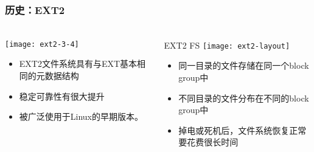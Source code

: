 \begin{frame}[fragile]
	\frametitle{历史：EXT2}
	
	\frametitle{ }
	\begin{columns}[t]
		\begin{column}{.3\textwidth}
			
			\texttt{[image: ext2-3-4]}
			\begin{itemize}
				\item EXT2文件系统具有与EXT基本相同的元数据结构
				\item 稳定可靠性有很大提升
				\item 被广泛使用于Linux的早期版本。
				
			\end{itemize}
			
		\end{column}
		
		\begin{column}{.7\textwidth}			
			EXT2 FS
			\texttt{[image: ext2-layout]}
			\begin{itemize}
				\item 同一目录的文件存储在同一个block group中
				\item 不同目录的文件分布在不同的block group中
				\item 掉电或死机后，文件系统恢复正常要花费很长时间
			\end{itemize}
			
		\end{column}
	\end{columns}
	
\end{frame}



